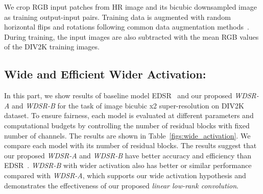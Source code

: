 \documentclass{article}
\begin{document}
We crop  RGB input patches from HR image and its bicubic downsampled image as training output-input pairs. Training data is augmented with random horizontal flips and rotations following common data augmentation methods~\cite{fan2017balanced, lim2017enhanced}. During training, the input images are also subtracted with the mean RGB values of the DIV2K training images.

\subsection{Wide and Efficient Wider Activation:}

In this part, we show results of baseline model EDSR~\cite{lim2017enhanced} and our proposed \textit{WDSR-A} and \textit{WDSR-B} for the task of image bicubic x2 super-resolution on DIV2K dataset. To ensure fairness, each model is evaluated at different parameters and computational budgets by controlling the number of residual blocks with fixed number of channels. The results are shown in Table~\ref{figs:wide_activation}. We compare each model with its number of residual blocks. The results suggest that our proposed \textit{WDSR-A} and \textit{WDSR-B} have better accuracy and efficiency than EDSR~\cite{lim2017enhanced}. \textit{WDSR-B} with wider activation also has better or similar performance compared with \textit{WDSR-A}, which supports our wide activation hypothesis and demonstrates the effectiveness of our proposed \textit{linear low-rank convolution}.
\end{document}
